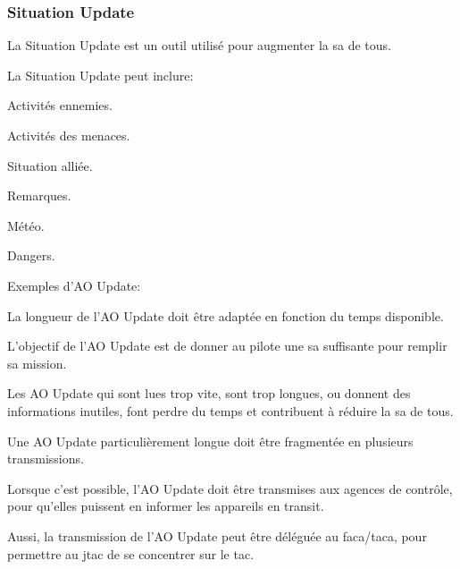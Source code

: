 \subsubsection{Situation Update}%
	
\begin{e1}
	\item La Situation Update est un outil utilisé pour augmenter la \gls{sa} de tous.
	
	La Situation Update peut inclure:
	
	\begin{e2}
		
		\item Activités ennemies.
		\item Activités des menaces.
		\item Situation alliée.
		\item Remarques.
		\item Météo.
		\item Dangers.
		
	\end{e2}
	
	\item Exemples d'AO Update:
	
	
	
	\begin{e2}
		\item La longueur de l'AO Update doit être adaptée en fonction du temps disponible.
		
		L'objectif de l'AO Update est de donner au pilote une \gls{sa} suffisante pour remplir sa mission.
		
		Les AO Update qui sont lues trop vite, sont trop longues, ou donnent des informations inutiles, font perdre du temps et contribuent à réduire la \gls{sa} de tous.
		
		Une AO Update particulièrement longue doit être fragmentée en plusieurs transmissions.
		
		\item Lorsque c'est possible, l'AO Update doit être transmises aux agences de contrôle, pour qu'elles puissent en informer les appareils en transit.
		
		Aussi, la transmission de l'AO Update peut être déléguée au \gls{faca}/\gls{taca}, pour permettre au \gls{jtac} de se concentrer sur le \gls{tac}.
		
\end{e2}
\end{e1}
